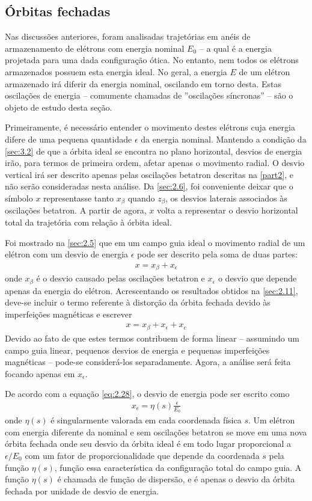\subsection{Órbitas fechadas}
Nas discussões anteriores, foram analisadas trajetórias em anéis de armazenamento de elétrons com energia nominal $E_0$ --  a qual é a energia projetada para uma dada configuração ótica. No entanto, nem todos os elétrons armazenados possuem esta energia ideal. No geral, a energia $E$ de um elétron armazenado irá diferir da energia nominal, oscilando em torno desta. Estas oscilações de energia -- comumente chamadas de ''oscilações síncronas'' -- são o objeto de estudo desta seção.

Primeiramente, é necessário entender o movimento destes elétrons cuja energia difere de uma pequena quantidade $\epsilon$ da energia nominal. Mantendo a condição da \autoref{sec:3.2} de que a órbita ideal se encontra no plano horizontal, desvios de energia irão, para termos de primeira ordem, afetar apenas o movimento radial. O desvio vertical irá ser descrito apenas pelas oscilações betatron descritas na \autoref{part2}, e não serão consideradas nesta análise. Da \autoref{sec:2.6}, foi conveniente deixar que o símbolo $x$ representasse tanto $x_\beta$ quando $z_\beta$, os desvios laterais associados às oscilações betatron. A partir de agora, $x$ volta a representar o desvio horizontal total da trajetória com relação à órbita ideal.

Foi mostrado na \autoref{sec:2.5} que em um campo guia ideal o movimento radial de um elétron com um desvio de energia $\epsilon$ pode ser descrito pela soma de duas partes:
\begin{align}
	x = x_\beta + x_\epsilon
\end{align}
onde $x_\beta$ é o desvio causado pelas oscilações betatron e $x_\epsilon$ o desvio que depende apenas da energia do elétron. Acrescentando os resultados obtidos na \autoref{sec:2.11}, deve-se incluir o termo referente à distorção da órbita fechada devido às imperfeições magnéticas e escrever
\begin{align}
	x = x_\beta + x_\epsilon + x_c
\end{align}
Devido ao fato de que estes termos contribuem de forma linear -- assumindo um campo guia linear, pequenos desvios de energia e pequenas imperfeições magnéticas -- pode-se considerá-los separadamente. Agora, a análise será feita focando apenas em $x_\epsilon$.

De acordo com a equação \eqref{eq:2.28}, o desvio de energia pode ser escrito como
\begin{align}
	x_\epsilon = \eta(s)\frac{\epsilon}{E_0}\label{eq:3.3}
\end{align}
onde $\eta(s)$ é singularmente valorada em cada coordenada física $s$. Um elétron com energia diferente da nominal e sem oscilações betatron se move em uma nova órbita fechada onde seu desvio da órbita ideal é em todo lugar proporcional a $\epsilon/E_0$ com um fator de proporcionalidade que depende da coordenada $s$ pela função $\eta(s)$, função essa característica da configuração total do campo guia. A função $\eta(s)$ é chamada de função de dispersão, e é apenas o desvio da órbita fechada por unidade de desvio de energia.

